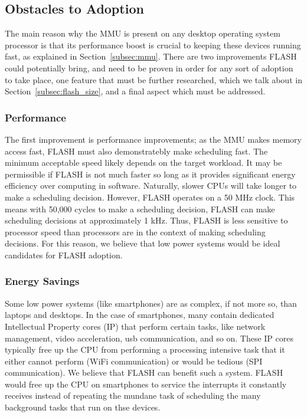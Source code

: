 \documentclass{sig-alternate-10pt}
\begin{document}
\subsection{Obstacles to Adoption}
The main reason why the MMU is present on any desktop operating system
processor is that its performance boost is crucial to keeping these devices
running fast, as explained in Section~\ref{subsec:mmu}. There are two
improvements FLASH could potentially bring, and need to be proven in order
for any sort of adoption to take place, one feature that must be further
researched, which we talk about in Section~\ref{subsec:flash_size}, and
a final aspect which must be addressed.

\subsubsection{Performance}
The first improvement is performance improvements; as the MMU makes memory
access fast, FLASH must also demonstratebly make scheduling fast. The
minimum acceptable speed likely depends on the target workload.  It may be
permissible if FLASH is not much faster so long as it provides significant
energy efficiency over computing in software. Naturally, slower CPUs will
take longer to make a scheduling decision.  However, FLASH operates on a 50
MHz clock.  This means with 50,000 cycles to make a scheduling decision,
FLASH can make scheduling decisions at approximately 1 kHz. Thus, FLASH is
less sensitive to processor speed than processors are in the context of
making scheduling decisions. For this reason, we believe that low power
systems would be ideal candidates for FLASH adoption.

\subsubsection{Energy Savings}
Some low power systems (like smartphones) are as complex, if not more so,
than laptops and desktops. In the case of smartphones, many contain
dedicated Intellectual Property cores (IP) that perform certain tasks, like
network management, video acceleration, usb communication, and so on. These IP
cores typically free up the CPU from performing a processing intensive task
that it either cannot perform (WiFi communication) or would be tedious (SPI
communication). We believe that FLASH can benefit such a system. FLASH would
free up the CPU on smartphones to service the interrupts it constantly
receives instead of repeating the mundane task of scheduling the many
background tasks that run on thse devices.
\end{document}
